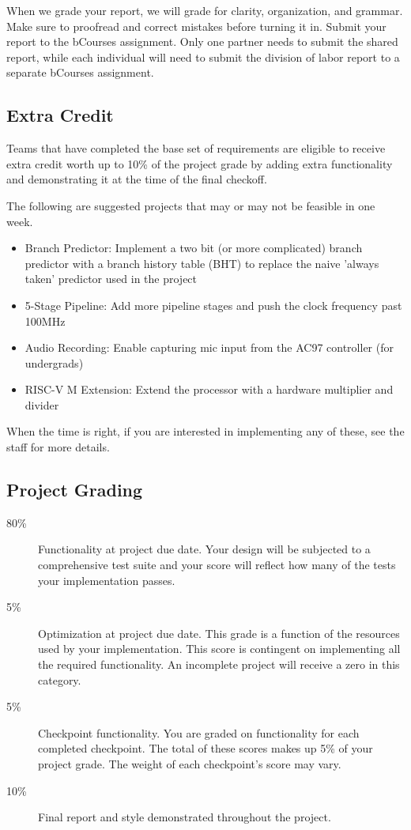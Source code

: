 \documentclass[11pt]{article}
\begin{document}
When we grade your report, we will grade for clarity, organization, and grammar. Make sure to proofread and correct mistakes before turning it in. Submit your report to the bCourses assignment. Only one partner needs to submit the shared report, while each individual will need to submit the division of labor report to a separate bCourses assignment.

\subsection{Extra Credit}
\label{extra_credit}
Teams that have completed the base set of requirements are eligible to receive extra credit worth up to 10\% of the project grade by adding extra functionality and demonstrating it at the time of the final checkoff.

The following are suggested projects that may or may not be feasible in one week. 
\begin{itemize}
	\item Branch Predictor: Implement a two bit (or more complicated) branch predictor with a branch history table (BHT) to replace the naive 'always taken' predictor used in the project
	\item 5-Stage Pipeline: Add more pipeline stages and push the clock frequency past 100MHz
	\item Audio Recording: Enable capturing mic input from the AC97 controller (for undergrads)
	\item RISC-V M Extension: Extend the processor with a hardware multiplier and divider
\end{itemize}
When the time is right, if you are interested in implementing any of these, see the staff for more details.

\subsection{Project Grading}
\label{deadlinegrading}

\begin{description}
  \item[80\%] {Functionality} at project due date. Your design will be subjected to a comprehensive test suite and your score will reflect how many of the tests your implementation passes.
  \item[5\%] {Optimization} at project due date. This grade is a function of the resources used by your implementation. This score is contingent on implementing all the required functionality.  An incomplete project will receive a zero in this category.
  \item[5\%] {Checkpoint} functionality. You are graded on functionality for each completed checkpoint. The total of these scores makes up 5\% of your project grade. The weight of each checkpoint's score may vary.
  \item[10\%] {Final report} and {style} demonstrated throughout the project.
\end{description}
\end{document}
